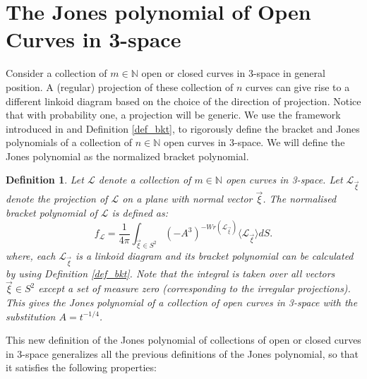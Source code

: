 \documentclass{article}
\newtheorem{definition}{Definition}[section]
\begin{document}
\section{The Jones polynomial of Open Curves in 3-space}
\label{open curves}

Consider a collection of $m \in \mathbb{N}$ open or closed curves in 3-space in general position. A (regular) projection of these collection of $n$ curves can give rise to a different linkoid diagram based on the choice of the direction of projection. Notice that with probability one, a projection will be generic. We use the framework introduced in \cite{Panagiotou2020b} and Definition \ref{def_bkt}, to rigorously define the bracket and Jones polynomials of a collection of $n\in \mathbb{N}$ open curves in 3-space. We will define the Jones polynomial as the normalized bracket polynomial.

\begin{definition}\label{jones3}
Let $\mathcal{L}$ denote a collection of $m \in \mathbb{N}$ open curves in 3-space. Let $\mathcal{L}_{\vec{\xi}}$ denote the projection of $\mathcal{L}$ on a plane with normal vector $\vec{\xi}$. The normalised bracket polynomial of $\mathcal{L}$ is defined as:
\begin{equation}
f_{\mathcal{L}}=\frac{1}{4 \pi} \int_{\vec{\xi}\in S^2} (-A^3)^{-Wr(\mathcal{L}_{\vec{\xi}})}\langle \mathcal{L}_{\vec{\xi}} \rangle dS.
    \label{jones_open_curves}
\end{equation}
where, each $\mathcal{L}_{\vec{\xi}}$ is a linkoid diagram and its bracket polynomial can be calculated by using Definition \ref{def_bkt}. Note that the integral is taken over all vectors $\vec{\xi} \in S^2$ except a set of measure zero (corresponding to the irregular projections). This gives the Jones polynomial of a collection of open curves in 3-space with the substitution $A=t^{-1/4}$.
\end{definition}

This new definition of the Jones polynomial of collections of open or closed curves in 3-space generalizes all the previous definitions of the Jones polynomial, so that it satisfies the following properties:
\end{document}

